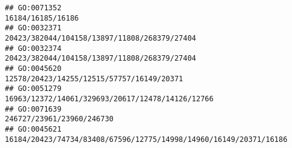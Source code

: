 \documentclass[
]{article}
\begin{document}
\begin{verbatim}
## GO:0071352                                                                                                                                                                                                                                                                                                                                                                                            16184/16185/16186
## GO:0032371                                                                                                                                                                                                                                                                                                                                                                 20423/382044/104158/13897/11808/268379/27404
## GO:0032374                                                                                                                                                                                                                                                                                                                                                                 20423/382044/104158/13897/11808/268379/27404
## GO:0045620                                                                                                                                                                                                                                                                                                                                                                    12578/20423/14255/12515/57757/16149/20371
## GO:0051279                                                                                                                                                                                                                                                                                                                                                             16963/12372/14061/329693/20617/12478/14126/12766
## GO:0071639                                                                                                                                                                                                                                                                                                                                                                                    246727/23961/23960/246730
## GO:0045621                                                                                                                                                                                                                                                                                                                                            16184/20423/74734/83408/67596/12775/14998/14960/16149/20371/16186

\end{verbatim}
\end{document}
